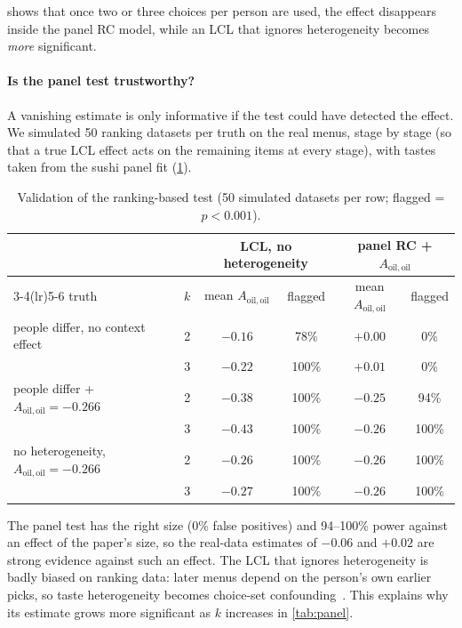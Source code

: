 \documentclass[11pt,a4paper]{article}
\theoremstyle{remark}
\newcommand{\Aoo}{A_{\mathrm{oil,oil}}}
\begin{document}
 shows that once two or three choices per person are used, the effect disappears inside the
panel RC model, while an LCL that ignores heterogeneity becomes \emph{more} significant.

\paragraph{Is the panel test trustworthy?}
A vanishing estimate is only informative if the test could have detected the effect. We simulated 50
ranking datasets per truth on the real menus, stage by stage (so that a true LCL effect acts on the
remaining items at every stage), with tastes taken from the sushi panel fit (\cref{tab:panelcheck}).

\begin{table}[!htbp]
\centering\small
\begin{tabular}{lccccc}
\toprule
 & & \multicolumn{2}{c}{LCL, no heterogeneity} & \multicolumn{2}{c}{panel RC + $\Aoo$}\\
\cmidrule(lr){3-4}\cmidrule(lr){5-6}
truth & $k$ & mean $\Aoo$ & flagged & mean $\Aoo$ & flagged\\
\midrule
people differ, no context effect & 2 & $-0.16$ & 78\% & $+0.00$ & 0\%\\
 & 3 & $-0.22$ & 100\% & $+0.01$ & 0\%\\
people differ + $\Aoo=-0.266$ & 2 & $-0.38$ & 100\% & $-0.25$ & 94\%\\
 & 3 & $-0.43$ & 100\% & $-0.26$ & 100\%\\
no heterogeneity, $\Aoo=-0.266$ & 2 & $-0.26$ & 100\% & $-0.26$ & 100\%\\
 & 3 & $-0.27$ & 100\% & $-0.26$ & 100\%\\
\bottomrule
\end{tabular}
\caption{Validation of the ranking-based test (50 simulated datasets per row; flagged = $p<0.001$).}
\label{tab:panelcheck}
\end{table}

The panel test has the right size (0\% false positives) and 94--100\% power against an effect of the
paper's size, so the real-data estimates of $-0.06$ and $+0.02$ are strong evidence against such an
effect. The LCL that ignores heterogeneity is badly biased on ranking data: later menus depend on the
person's own earlier picks, so taste heterogeneity becomes choice-set confounding~\cite{tub21}. This
explains why its estimate grows more significant as $k$ increases in \cref{tab:panel}.
\end{document}
